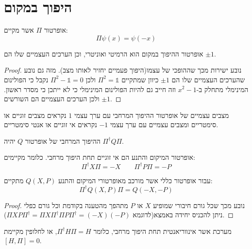 \documentclass{tstextbook}
\begin{document}
\section{היפוך במקום}

\begin{definition}
אופרטור \(\Pi\) אשר מקיים:
$$\Pi \psi(x)=\psi(-x)$$

\end{definition}
\begin{proposition}
אופרטור ההיפוך במקום הוא הרמיטי ואוניטרי, וכן הערכים העצמיים שלו הם \(\pm 1\).

\end{proposition}
\begin{proof}
נובע ישירות מכך שההופכי של עצמו(היפוך פעמיים יחזיר לאותו מצב). מזה גם נובע שהערכים העצמיים שלו הם \(\pm 1\) כיוון שמתקיים \(\Pi^{2}=\mathbb{1}\) ולכן \(\Pi^{2}-\mathbb{1}=0\) נקבל כי הפולינום המינימלי מתחלק ב-\(x^{2}-1\) וזה חייב גם להיות הפולינום המינימלי כי לא ייתכן כי מסדר ראשון. ולכן הערכים העצמיים הם השורשים \(\pm 1\).

\end{proof}
\begin{definition}
מצבים עצמיים של אופרטור ההיפוך המרחבי עם ערך עצמי \(1\) נקראים מצבים זוגיים או סימטריים ומצבים עצמיים עם ערך עצמי \(-1\) נקראים אי זוגיים או אנטי סימטריים.

\end{definition}
\begin{proposition}
ההיפוך המרחבי של אופרטור \(Q\) יהיה \(\Pi ^{\dagger}Q \Pi\). 

\end{proposition}
\begin{proposition}
אופרטור המיקום והתנע הם אי זוגיים תחת היפוך מרחבי. כלומר מקיימים:
$$\Pi ^{\dagger} X\Pi=-X\qquad \Pi ^{\dagger}P \Pi=-P$$

\end{proposition}
\begin{corollary}
עבור אופרטור כללי אשר מורכב מאופרטורי המיקום והתנע \(Q(X,P)\) מתקיים:
$$\Pi ^{\dagger}Q(X,P)\Pi = Q(-X,-P)$$

\end{corollary}
\begin{proof}
נובע מכך שכל גורם חיבורי שמופיע \(X\) או \(P\) מתהפך מהטענה בקודמת וכל גורם כפלי ניתן להכניס יחידה באמצא(לדוגמא \(\Pi XP \Pi ^{\dagger}=\Pi X\Pi ^{\dagger}\Pi P \Pi ^{\dagger}=(-X)(-P)\)).

\end{proof}
\begin{definition}
מערכת אשר אינווריאנטית תחת היפוך מרחבי, כלומר \(\Pi ^{\dagger}H\Pi=H\), או לחלופין מקיימת \(\left[ H,\Pi \right]=0\).

\end{definition}
\end{document}
